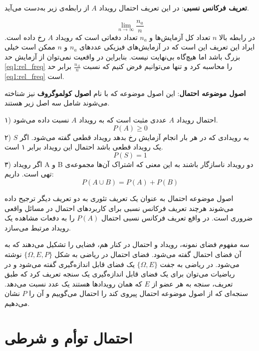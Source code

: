 \textbf{تعریف فرکانس نسبی}: در این تعریف احتمال رویداد $A$ از رابطه‌ی زیر به‌دست می‌آید.

\begin{equation}        
    \lim_{n\to\infty} \frac{n_a}{n}
    \label{eq1:rel_freq}
\end{equation}
در رابطه بالا $n$ تعداد کل آزمایش‌ها و $n_a$ تعداد دفعاتی است که رویداد $A$ رخ داده است. ایراد این تعریف این است که در آزمایش‌های فیزیکی عددهای $n_a$ و $n$ ممکن است خیلی بزرگ باشد اما هیچ‌گاه بی‌نهایت نیست. بنابراین در واقعیت نمی‌توان از آزمایش حد \ref{eq1:rel_freq} را محاسبه کرد و تنها می‌توانیم فرض کنیم که نسبت $\frac{n_A}{n}$ برابر حد \ref{eq1:rel_freq} است.

\textbf{اصول موضوعه احتمال}: این اصول موضوعه که با نام \textbf{اصول کولموگروف}  نیز شناخته می‌شوند شامل سه اصل زیر هستند.

۱) احتمال رویداد $A$ عددی مثبت است که به رویداد $A$ نسبت داده می‌شود.
\begin{equation}
    P(A) \geq 0
    \label{eq2:axiom1}
\end{equation}
۲) به رویدادی که در هر بار انجام آزمایش رخ بدهد رویداد قطعی گفته می‌شود. اگر $S$ یک رویداد قطعی باشد احتمال این رویداد برابر ۱ است.
\begin{equation}
    P(S) = 1
    \label{eq3:axiom2}
\end{equation}
۳) اگر رویداد A و B دو رویداد ناسازگار باشند به این معنی که اشتراک آن‌ها مجموعه‌ی تهی است. داریم:
\begin{equation}
    P(A\cup B) = P(A) + P(B)
    \label{eq4:axiom3}
\end{equation}

اصول موضوعه احتمال به عنوان یک تعریف تئوری به دو تعریف دیگر ترجیح داده می‌شوند هرچند تعریف فرکانس نسبی برای کاربردهای احتمال در مسائل واقعی ضروری است. در‌ واقع  تعریف فرکانس نسبی احتمال $P(A)$ را به دفعات مشاهده یک رویداد مرتبط می‌سازد.\cite{papoulis_probability_2009}

سه مفهوم فضای نمونه، رویداد و احتمال در کنار هم، فضایی را تشکیل می‌دهند که به آن فضای احتمال گفته می‌شود. فضای احتمال در ریاضی به شکل $\{\Omega,E,P\}$ نوشته می‌شود. در ریاضی به جفت $\{\Omega,E\}$ یک فضای قابل اندازه‌گیری گفته می‌شود و در ریاضیات می‌توان برای یک فضای قابل اندازه‌گیری یک سنجه تعریف کرد که طبق تعریف، سنجه به هر عضو از $E$ که همان رویدادها هستند یک عدد نسبت می‌دهد. سنجه‌ای که از اصول موضوعه احتمال پیروی کند را احتمال می‌گوییم و آن را $P$ نشان می‌دهیم.

\section{احتمال توأم و شرطی}
\label{ch1:sec4:j_cond_prob}

